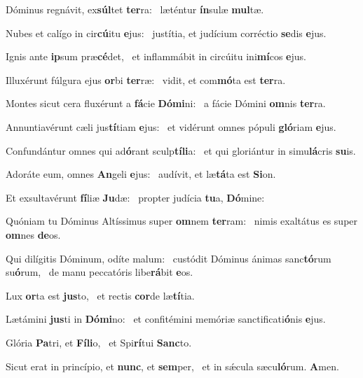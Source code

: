 \item Dóminus regnávit, ex\textbf{súl}tet \textbf{ter}ra:~\psstar{} læténtur \textbf{ín}sulæ \textbf{mul}tæ.
\item Nubes et calígo in cir\textbf{cú}itu \textbf{e}jus:~\psstar{} justítia, et judícium corréctio \textbf{se}dis \textbf{e}jus.
\item Ignis ante \textbf{ip}sum præ\textbf{cé}det,~\psstar{} et inflammábit in circúitu ini\textbf{mí}cos \textbf{e}jus.
\item Illuxérunt fúlgura ejus \textbf{or}bi \textbf{ter}ræ:~\psstar{} vidit, et com\textbf{mó}ta est \textbf{ter}ra.
\item Montes sicut cera fluxérunt a \textbf{fá}cie \textbf{Dó}\textbf{mi}ni:~\psstar{} a fácie Dómini \textbf{om}nis \textbf{ter}ra.
\item Annuntiavérunt cæli jus\textbf{tí}tiam \textbf{e}jus:~\psstar{} et vidérunt omnes pópuli \textbf{gló}riam \textbf{e}jus.
\item Confundántur omnes qui ad\textbf{ó}rant sculp\textbf{tí}\textbf{li}a:~\psstar{} et qui gloriántur in simu\textbf{lá}cris \textbf{su}is.
\item Adoráte eum, omnes \textbf{An}geli \textbf{e}jus:~\psstar{} audívit, et læ\textbf{tá}ta est \textbf{Si}on.
\item Et exsultavérunt \textbf{fí}liæ \textbf{Ju}dæ:~\psstar{} propter judícia \textbf{tu}a, \textbf{Dó}mine:
\item Quóniam tu Dóminus Altíssimus super \textbf{om}nem \textbf{ter}ram:~\psstar{} nimis exaltátus es super \textbf{om}nes \textbf{de}os.
\item Qui dilígitis Dóminum, odíte malum:~\pscross{} custódit Dóminus ánimas sanc\textbf{tó}rum su\textbf{ó}rum,~\psstar{} de manu peccatóris libe\textbf{rá}bit \textbf{e}os.
\item Lux \textbf{or}ta est \textbf{jus}to,~\psstar{} et rectis \textbf{cor}de læ\textbf{tí}tia.
\item Lætámini \textbf{jus}ti in \textbf{Dó}\textbf{mi}no:~\psstar{} et confitémini memóriæ sanctificati\textbf{ó}nis \textbf{e}jus.
\item Glória \textbf{Pa}tri, et \textbf{Fí}\textbf{li}o,~\psstar{} et Spi\textbf{rí}tui \textbf{Sanc}to.
\item Sicut erat in princípio, et \textbf{nunc}, et \textbf{sem}per,~\psstar{} et in sǽcula sæcu\textbf{ló}rum. \textbf{A}men.